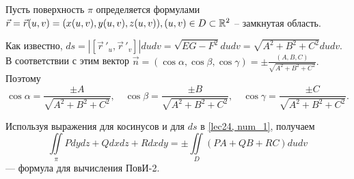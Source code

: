 \documentclass[../../main.tex]{subfiles}
\begin{document}
Пусть поверхность $\pi$ определяется формулами $\vec{r} = \vec{r}(u,v) = (x(u,v), y(u,v), z(u,v)), (u, v)\in D\subset \mathbb{R}^2$ -- замкнутая область.

Как известно, $ds = \left|\left[ \vec r\,'_u,  \vec r\,'_v\right]\right|dudv = \sqrt{EG - F^2}dudv = \sqrt{A^2 + B^2 + C^2}dudv.$ В соответствии с этим вектор $\vec{n} = (\cos\alpha, \cos\beta, \cos\gamma) = \pm\frac{(A, B, C)}{\sqrt{A^2 + B^2 + C^2}}.$ Поэтому $$\cos\alpha = \frac{\pm A}{\sqrt{A^2 + B^2 + C^2}},\quad \cos\beta = \frac{\pm B}{\sqrt{A^2 + B^2 + C^2}},\quad \cos\gamma = \frac{\pm C}{\sqrt{A^2 + B^2 + C^2}}.$$

Используя выражения для косинусов и для $ds$ в \eqref{lec24, num_1}, получаем
\begin{equation}\label{lec24, num_2}
\iint\limits_\pi Pdydz + Qdxdz + Rdxdy = \pm \iint\limits_D(PA + QB + RC)dudv
\end{equation}
--- формула для вычисления ПовИ-2.
\end{document}
